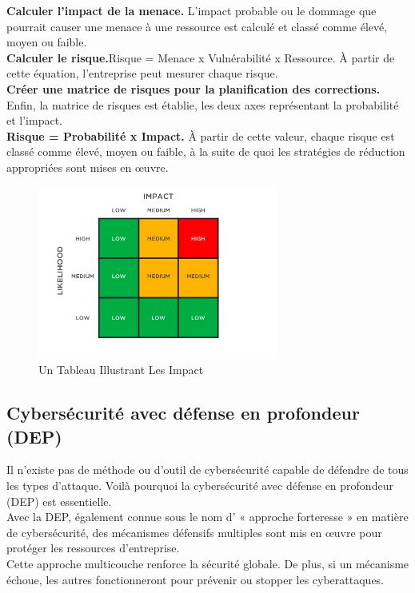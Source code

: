  \textbf{Calculer l’impact de la menace.} L’impact probable ou le dommage que pourrait causer une menace à une ressource est calculé et classé comme élevé, moyen ou faible.\\
 \textbf{Calculer le risque.}Risque = Menace x Vulnérabilité x Ressource. À partir de cette équation, l’entreprise peut mesurer chaque risque.\\
\textbf{ Créer une matrice de risques pour la planification des corrections.} Enfin, la matrice de risques est établie, les deux axes représentant la probabilité et l’impact.\\

\textbf{Risque = Probabilité x Impact.} À partir de cette valeur, chaque risque est classé comme élevé, moyen ou faible, à la suite de quoi les stratégies de réduction appropriées sont mises en œuvre.\\
	
\begin{figure}[h]
	\begin{center}
	\includegraphics[width=0.7\textwidth]{PhotoMemoire/tableauImpact.png}
\caption{Un Tableau Illustrant Les Impact }
\end{center}
\end{figure}

\subsection{Cybersécurité avec défense en profondeur (DEP)}
Il n’existe pas de méthode ou d’outil de cybersécurité capable de défendre de tous les types d’attaque. Voilà pourquoi la cybersécurité avec défense en profondeur (DEP) est essentielle.\\
 Avec la DEP, également connue sous le nom d’ « approche forteresse » en matière de cybersécurité, des mécanismes défensifs multiples sont mis en œuvre pour protéger les ressources d’entreprise.\\
  Cette approche multicouche renforce la sécurité globale. De plus, si un mécanisme échoue, les autres fonctionneront pour prévenir ou stopper les cyberattaques.\\

